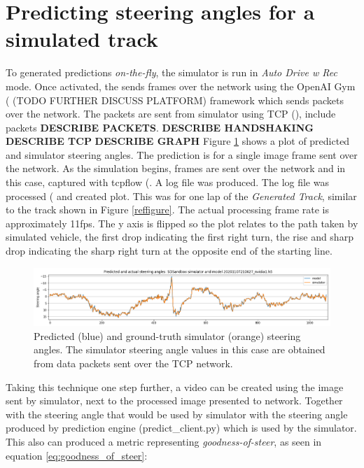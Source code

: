 
\section{Predicting steering angles for a simulated track}

To generated predictions \textit{on-the-fly}, the simulator is run in \textit{Auto Drive w Rec} mode. Once activated, the sends frames over the network using the OpenAI Gym (\cite{brockman2016openai} (TODO FURTHER DISCUSS PLATFORM) framework which sends packets over the network. The packets are sent from simulator using TCP (\cite{rfc793}), include packets \textbf{DESCRIBE PACKETS}.  
\textbf{DESCRIBE HANDSHAKING} \textbf{DESCRIBE TCP} 
\textbf{DESCRIBE GRAPH}
Figure \ref{fig:PredSteeringAnglestcpflowNvidia1} shows a plot of predicted and simulator steering angles. The prediction is for a single image frame sent over the network. As the simulation begins, frames are sent over the network and in this case, captured with tcpflow (\cite{garfinkel2013passive}. A log file was produced. The log file was processed (\cite{JUPYTERNOTEBOOKINAPPENDIX} and created plot. This was for one lap of the \textit{Generated Track}, similar to the track shown in Figure \ref{reffigure}. The actual processing frame rate is approximately 11fps. The y axis is flipped so the plot relates to the path taken by simulated vehicle, the first drop indicating the first right turn, the rise and sharp drop indicating the sharp right turn at the opposite end of the starting line.

\begin{figure}[ht]
 \centering 
 \includegraphics[width=\textwidth]{Figures/PredSteeringAnglestcpflowNvidia1.png}
 \caption{Predicted (blue) and ground-truth simulator (orange) steering angles. The simulator steering angle values in this case are obtained from data packets sent over the TCP network.}
 \label{fig:PredSteeringAnglestcpflowNvidia1}
\end{figure}

Taking this technique one step further, a video can be created using the image sent by simulator, next to the processed image presented to network. Together with the steering angle that would be used by simulator with the steering angle produced by prediction engine (predict\_client.py) which is used by the simulator.
This also can produced a metric representing \textit{goodness-of-steer}, as seen in equation     \ref{eq:goodness_of_steer}:

